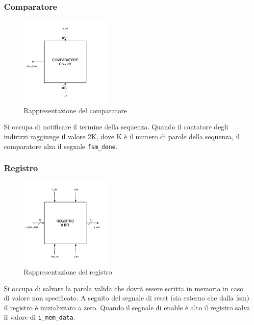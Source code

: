 \subsubsection{Comparatore}
\begin{figure}[H]
    \centering
    \includegraphics[width=0.4\textwidth]{figures/comparator.png}
    \caption{Rappresentazione del comparatore}
    \label{fig:comparator}
\end{figure}

Si occupa di notificare il termine della sequenza. Quando il contatore degli indirizzi raggiunge il valore 2K, dove K è il numero di parole della sequenza, il comparatore alza il segnale \lstinline[columns=fixed]{fsm_done}.

\subsubsection{Registro}
\begin{figure}[H]
    \centering
    \includegraphics[width=0.4\textwidth]{figures/register_8.png}
    \caption{Rappresentazione del registro}
    \label{fig:register_8}
\end{figure}

Si occupa di salvare la parola valida che dovrà essere scritta in memoria in caso di valore non specificato. A seguito del segnale di reset (sia esterno che dalla fsm) il registro è inizializzato a zero. Quando il segnale di enable è alto il registro salva il valore di \lstinline[columns=fixed]{i_mem_data}.
